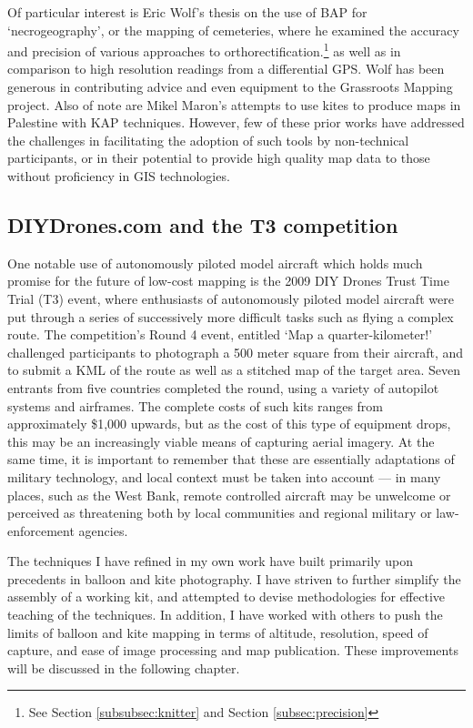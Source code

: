 \documentclass[11pt,oneside,notitlepage]{report}
\begin{document}
{{Of particular interest is Eric Wolf's thesis on the use of \ac{BAP} for `necrogeography', or the mapping of cemeteries, where he examined the accuracy and precision of various approaches to orthorectification.\footnote{See Section \ref{subsubsec:knitter} and Section \ref{subsec:precision}} as well as in comparison to high resolution readings from a differential GPS. Wolf has been generous in contributing advice and even equipment to the Grassroots Mapping project. Also of note are Mikel Maron's attempts to use kites to produce maps in Palestine \cite{maron2008former} with \ac{KAP} techniques. However, few of these prior works have addressed the challenges in facilitating the adoption of such tools by non-technical participants, or in their potential to provide high quality map data to those without proficiency in GIS technologies.  

\subsection{DIYDrones.com and the T3 competition}

One notable use of autonomously piloted model aircraft which holds much promise for the future of low-cost mapping is the 2009 DIY Drones Trust Time Trial (T3) event, where enthusiasts of autonomously piloted model aircraft were put through a series of successively more difficult tasks such as flying a complex route. The competition's Round 4 event, entitled `Map a quarter-kilometer!' challenged participants to photograph a 500 meter square from their aircraft, and to submit a \ac{KML} of the route as well as a stitched map of the target area. Seven entrants from five countries completed the round, using a variety of autopilot systems and airframes. \cite{anderson2010winners} The complete costs of such kits ranges from approximately \$1,000 upwards, but as the cost of this type of equipment drops, this may be an increasingly viable means of capturing aerial imagery. At the same time, it is important to remember that these are essentially adaptations of military technology, and local context must be taken into account --- in many places, such as the West Bank, remote controlled aircraft may be unwelcome or perceived as threatening both by local communities and regional military or law-enforcement agencies. 

The techniques I have refined in my own work have built primarily upon precedents in balloon and kite photography. I have striven to further simplify the assembly of a working kit, and attempted to devise methodologies for effective teaching of the techniques. In addition, I have worked with others to push the limits of balloon and kite mapping in terms of altitude, resolution, speed of capture, and ease of image processing and map publication. These improvements will be discussed in the following chapter.

}}
\end{document}
